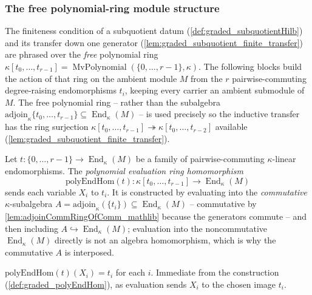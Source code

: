 \subsubsection*{The free polynomial-ring module structure}

The finiteness condition of a subquotient datum (\cref{def:graded_subquotientHilb}) and
its transfer down one generator (\cref{lem:graded_subquotient_finite_transfer}) are
phrased over the \emph{free} polynomial ring \(\kappa[t_0, \dots, t_{r-1}] =
\operatorname{MvPolynomial}(\{0, \dots, r-1\}, \kappa)\). The following blocks build the
action of that ring on the ambient module \(M\) from the \(r\) pairwise-commuting
degree-raising endomorphisms \(t_i\), keeping every carrier an ambient submodule of
\(M\). The free polynomial ring -- rather than the subalgebra
\(\mathrm{adjoin}_\kappa\{t_0, \dots, t_{r-1}\} \subseteq \operatorname{End}_\kappa(M)\)
-- is used precisely so the inductive transfer has the ring surjection
\(\kappa[t_0, \dots, t_{r-1}] \twoheadrightarrow \kappa[t_0, \dots, t_{r-2}]\) available
(\cref{lem:graded_subquotient_finite_transfer}).

\begin{definition}
  \label{def:graded_polyEndHom}
  Let \(t : \{0, \dots, r-1\} \to \operatorname{End}_\kappa(M)\) be a family of
  pairwise-commuting \(\kappa\)-linear endomorphisms. The \emph{polynomial evaluation
  ring homomorphism}
  \[
    \mathrm{polyEndHom}(t) : \kappa[t_0, \dots, t_{r-1}] \longrightarrow
      \operatorname{End}_\kappa(M)
  \]
  sends each variable \(X_i\) to \(t_i\). It is constructed by evaluating into the
  \emph{commutative} \(\kappa\)-subalgebra \(A = \mathrm{adjoin}_\kappa(\{t_i\})
  \subseteq \operatorname{End}_\kappa(M)\) -- commutative by
  \cref{lem:adjoinCommRingOfComm_mathlib} because the generators commute -- and then
  including \(A \hookrightarrow \operatorname{End}_\kappa(M)\); evaluation into the
  noncommutative \(\operatorname{End}_\kappa(M)\) directly is not an algebra
  homomorphism, which is why the commutative \(A\) is interposed.
\end{definition}

\begin{lemma}
  \label{lem:graded_polyEndHom_X}
  \(\mathrm{polyEndHom}(t)(X_i) = t_i\) for each \(i\). Immediate from the construction
  (\cref{def:graded_polyEndHom}), as evaluation sends \(X_i\) to the chosen image
  \(t_i\).
\end{lemma}


